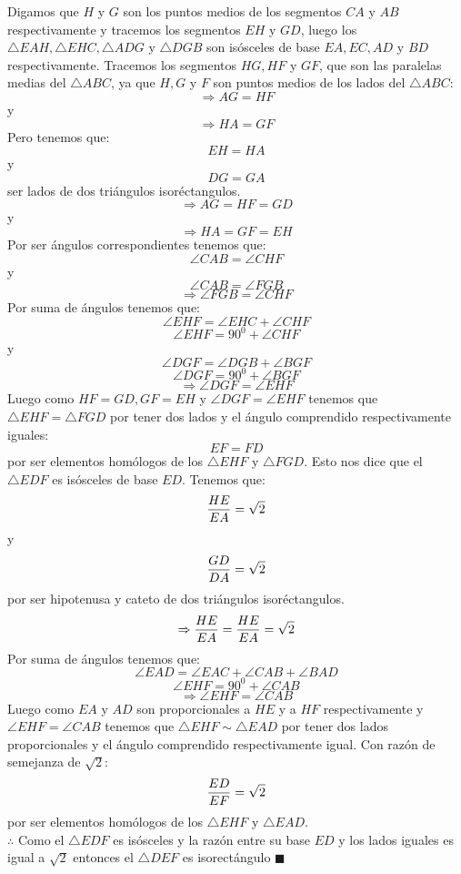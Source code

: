\documentclass{book}
\begin{document}
\begin{enumerate}
\begin{center}
        \end{center}
        Digamos que $H$ y $G$  son los puntos medios de los segmentos $CA$ y $AB$ respectivamente y tracemos los segmentos $EH$ y $GD$, luego los $\triangle EAH,\triangle EHC,\triangle ADG$ y $\triangle DGB$ son isósceles de base $EA,EC,AD$ y $BD$ respectivamente.
        Tracemos los segmentos $HG,HF$ y $GF$, que son las paralelas medias del $\triangle ABC$, ya que $H,G$ y $F$ son puntos medios de los lados del $\triangle ABC$:
        $$\Rightarrow AG=HF$$
        y
        $$\Rightarrow HA=GF$$
        Pero tenemos que:
        $$EH=HA$$
        y
        $$DG=GA$$
        ser lados de dos triángulos isoréctangulos.
        $$\Rightarrow AG=HF=GD$$
        y
        $$\Rightarrow HA=GF=EH$$
        Por ser ángulos correspondientes tenemos que:
        $$\angle CAB=\angle CHF$$
        y
        $$\angle CAB=\angle FGB$$
        $$\Rightarrow\angle FGB=\angle CHF$$
        Por suma de ángulos tenemos que:
        $$\angle EHF=\angle EHC+\angle CHF$$
        $$\angle EHF=90^0+\angle CHF$$
        y
        $$\angle DGF=\angle DGB+\angle BGF$$
        $$\angle DGF=90^0+\angle BGF$$
        $$\Rightarrow\angle DGF=\angle EHF$$
        Luego como $HF=GD,GF=EH$ y $\angle DGF=\angle EHF$ tenemos que $\triangle EHF=\triangle FGD$ por tener dos lados y el ángulo comprendido respectivamente iguales:
        $$EF=FD$$
        por ser elementos homólogos de los $\triangle EHF$ y $\triangle FGD$. Esto nos dice que el $\triangle EDF$ es isósceles de base $ED$.
        Tenemos que:
        $${HE\over EA}=\sqrt{2}$$
        y
        $${GD\over DA}=\sqrt{2}$$
        por ser hipotenusa y cateto de dos triángulos isoréctangulos.
        $$\Rightarrow{HE\over EA}={HE\over EA}=\sqrt{2}$$
        Por suma de ángulos tenemos que:
        $$\angle EAD=\angle EAC+\angle CAB+\angle BAD$$
        $$\angle EHF=90^0+\angle CAB$$
        $$\Rightarrow\angle EHF=\angle CAB$$
        Luego como $EA$ y $AD$ son proporcionales a $HE$ y a $HF$ respectivamente y $\angle EHF=\angle CAB$ tenemos que $\triangle EHF\sim\triangle EAD$ por tener dos lados proporcionales y el ángulo comprendido respectivamente igual. Con razón de semejanza de $\sqrt{2}$:
        $${ED\over EF}=\sqrt{2}$$
        por ser elementos homólogos de los $\triangle EHF$ y $\triangle EAD$.\\
        $\therefore$ Como el $\triangle EDF$ es isósceles y la razón entre su base $ED$ y los lados iguales es igual a $\sqrt{2}$ entonces el $\triangle DEF$ es isorectángulo $\blacksquare$\\

\end{enumerate}
\end{document}
